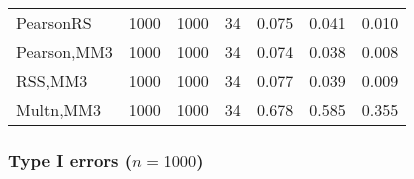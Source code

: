 \documentclass[
]{article}
\begin{document}
\begin{table}[H]
{\begin{tabular}[t]{lrrrrrr}
\hspace{1em}PearsonRS & 1000 & 1000 & 34 & 0.075 & 0.041 & 0.010\\
\hspace{1em}Pearson,MM3 & 1000 & 1000 & 34 & 0.074 & 0.038 & 0.008\\
\hspace{1em}RSS,MM3 & 1000 & 1000 & 34 & 0.077 & 0.039 & 0.009\\
\hspace{1em}Multn,MM3 & 1000 & 1000 & 34 & 0.678 & 0.585 & 0.355\\
\bottomrule
\end{tabular}}
\end{table}

\hypertarget{type-i-errors-n1000-1}{%
\subsubsection{\texorpdfstring{Type I errors
(\(n=1000\))}{Type I errors (n=1000)}}\label{type-i-errors-n1000-1}}
\end{document}
